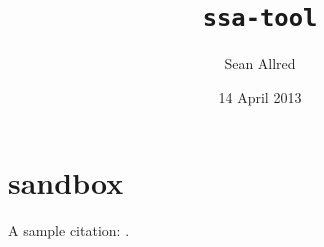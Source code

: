 \documentclass{cs-smp}[2013/12/23]
\title
                         {\texttt{ssa-tool}}%
            [A Utility for the Creation and Evaluation \\
                   of Self-Stabilizing Algorithms]
\author
                            {Sean Allred}%
                           [Alan Jamieson]
\date
                            {14 April 2013}
\begin{document}
\maketitle
\begin{abstract}
  
\end{abstract}


\lipsum[1-10]

\printbibliography
\appendix


\section{sandbox}
A sample citation: \autocites[26.1--26.45]{atallah2009algorithms}{Chen1991147}.
\end{document}

